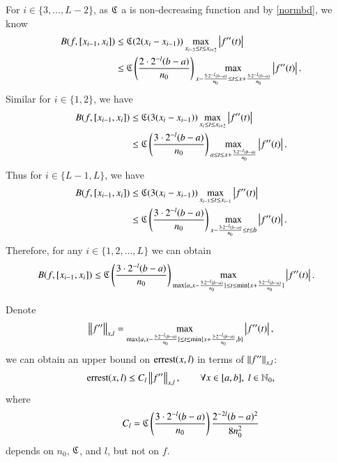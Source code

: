 For $i \in \{3, \ldots, L-2\}$,  as $\fC$ a is non-decreasing function and by \eqref{normbd}, we know
\begin{align*}
B(f,[x_{i-1},x_i]) & \le \fC (2(x_i-x_{i-1}))\max\limits_{x_{i-3}\le t \le x_{i+2}}\abs{f''(t)}\\
& \le \fC\left(\frac{2 \cdot2^{-l}(b-a)}{n_0}\right) \max\limits_{x-\frac{3\cdot 2^{-l}(b-a)}{n_0}\le t \le x+\frac{3\cdot 2^{-l}(b-a)}{n_0}}\abs{f''(t)}.
\end{align*}
Similar for $i\in \{1,2\}$, we have
\begin{align*}
B(f,[x_{i-1},x_i]) & \le \fC(3(x_i-x_{i-1}))\max\limits_{x_{i}\le t \le x_{i+2}}\abs{f''(t)}\\
& \le \fC\left(\frac{3\cdot2^{-l}(b-a)}{n_0}\right) \max\limits_{a\le t \le x +\frac{3\cdot 2^{-l}(b-a)}{n_0}}\abs{f''(t)}.
\end{align*}
Thus for $i \in \{L-1,L\}$, we have
\begin{align*}
B(f,[x_{i-1},x_i]) & \le \fC(3(x_i-x_{i-1})) \max\limits_{x_{i-3}\le t \le x_{i-1}}\abs{f''(t)}\\
& \le \fC\left(\frac{3\cdot2^{-l}(b-a)}{n_0}\right) \max\limits_{x-\frac{3\cdot 2^{-l}(b-a)}{n_0}\le t \le b}\abs{f''(t)}.
\end{align*}
Therefore, for any $i \in \{1,2,\ldots, L\}$ we can obtain
\begin{align*}
B(f,[x_{i-1},x_i]) & \le \fC\left(\frac{3\cdot2^{-l}(b-a)}{n_0}\right) \max\limits_{\max\{a,x-\frac{3\cdot 2^{-l}(b-a)}{n_0}\}\le t \le \min\{ x+\frac{3\cdot 2^{-l}(b-a)}{n_0}\}}\abs{f''(t)}.
\end{align*}

Denote
\[\norm[x,l]{f''}=\max\limits_{\max\{a,x-\frac{3\cdot 2^{-l}(b-a)}{n_0}\} \le t \le \min\{x+\frac{3\cdot 2^{-l}(b-a)}{n_0}, b\}}\abs{f''(t)},\]
we can obtain an upper bound on $\errest(x,l)$ in terms of $\norm[x,l]{f''}$:
\[
 \errest(x,l)  \le C_l \norm[x,l]{f''}, \qquad \forall x \in [a,b], \ l \in \natzero,
\]
where
\[\qquad C_l=\fC\left(\frac{3\cdot2^{-l}(b-a)}{n_0}\right) \frac{2^{-2l}(b-a)^2}{8n^2_0}
\]
depends on $n_0$, $\fC$, and $l$, but not on $f$.


